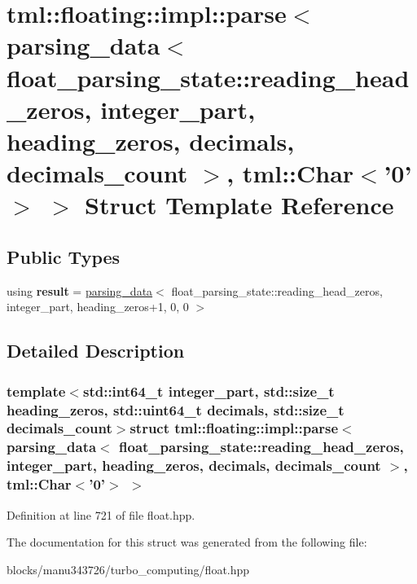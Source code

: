 \hypertarget{structtml_1_1floating_1_1impl_1_1parse_3_01parsing__data_3_01float__parsing__state_1_1reading__h7adcddb989702edb38356d079b26164a}{\section{tml\+:\+:floating\+:\+:impl\+:\+:parse$<$ parsing\+\_\+data$<$ float\+\_\+parsing\+\_\+state\+:\+:reading\+\_\+head\+\_\+zeros, integer\+\_\+part, heading\+\_\+zeros, decimals, decimals\+\_\+count $>$, tml\+:\+:Char$<$'0'$>$ $>$ Struct Template Reference}
\label{structtml_1_1floating_1_1impl_1_1parse_3_01parsing__data_3_01float__parsing__state_1_1reading__h7adcddb989702edb38356d079b26164a}
}
\subsection*{Public Types}
\begin{DoxyCompactItemize}
\item 
\hypertarget{structtml_1_1floating_1_1impl_1_1parse_3_01parsing__data_3_01float__parsing__state_1_1reading__h7adcddb989702edb38356d079b26164a_ab1688445103726535d8adefa7cbc8813}{using {\bfseries result} = \hyperlink{structtml_1_1floating_1_1impl_1_1parsing__data}{parsing\+\_\+data}$<$ float\+\_\+parsing\+\_\+state\+::reading\+\_\+head\+\_\+zeros, integer\+\_\+part, heading\+\_\+zeros+1, 0, 0 $>$}\label{structtml_1_1floating_1_1impl_1_1parse_3_01parsing__data_3_01float__parsing__state_1_1reading__h7adcddb989702edb38356d079b26164a_ab1688445103726535d8adefa7cbc8813}

\end{DoxyCompactItemize}


\subsection{Detailed Description}
\subsubsection*{template$<$std\+::int64\+\_\+t integer\+\_\+part, std\+::size\+\_\+t heading\+\_\+zeros, std\+::uint64\+\_\+t decimals, std\+::size\+\_\+t decimals\+\_\+count$>$struct tml\+::floating\+::impl\+::parse$<$ parsing\+\_\+data$<$ float\+\_\+parsing\+\_\+state\+::reading\+\_\+head\+\_\+zeros, integer\+\_\+part, heading\+\_\+zeros, decimals, decimals\+\_\+count $>$, tml\+::\+Char$<$'0'$>$ $>$}



Definition at line 721 of file float.\+hpp.



The documentation for this struct was generated from the following file\+:\begin{DoxyCompactItemize}
\item 
blocks/manu343726/turbo\+\_\+computing/float.\+hpp\end{DoxyCompactItemize}
